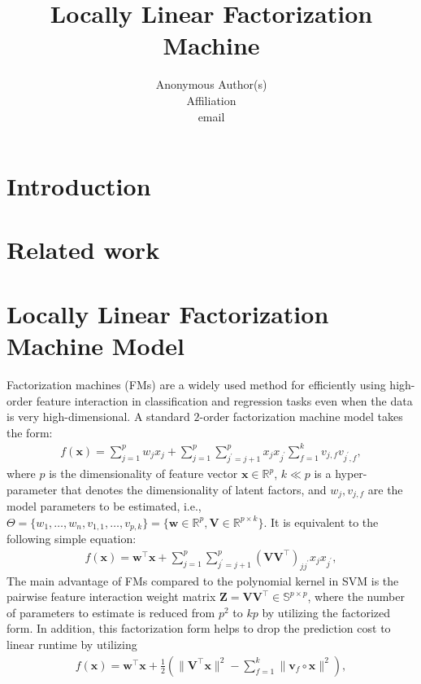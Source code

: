 \documentclass{article}
\title{Locally Linear Factorization Machine}
\author{Anonymous Author(s) \\
Affiliation \\
email}
\def \x {\mathbf{x}}
\def \w {\mathbf{w}}
\def \v {\mathbf{v}}
\def \V {\mathbf{V}}
\def \Z {\mathbf{Z}}
\begin{document}
\maketitle

\begin{abstract}

\end{abstract}

\section{Introduction}

\section{Related work}
\section{Locally Linear Factorization Machine Model}
Factorization machines (FMs) \cite{rendle2010factorization,rendle2012factorization} are a widely used method for efficiently using high-order feature interaction in classification and regression tasks even when the data is very high-dimensional. A standard $2$-order factorization machine model takes the form:
\begin{align}
f(\x) = \sum^p_{j=1}w_j x_j + \sum^p_{j=1}\sum^p_{j^\prime = j +1} x_j x_{j^\prime}\sum^k_{f=1}v_{j,f}v_{j^\prime,f},
\end{align}
where $p$ is the dimensionality of feature vector $\x \in \mathbb{R}^p$, $k \ll p$ is a hyper-parameter that denotes the dimensionality of latent factors, and $ w_j, v_{j,f}$ are the model parameters to be estimated, i.e., $\Theta=\{w_1,\dots,w_n,v_{1,1},\dots,v_{p,k}\}=\{\w \in \mathbb{R}^{p},\V \in \mathbb{R}^{p \times k}\}$. It is equivalent to the following simple equation:
\begin{align}
f(\x) = \w^\top\x+\sum^p_{j=1}\sum^p_{j^\prime=j+1}(\V\V^\top)_{jj^\prime}x_jx_{j^\prime},
\end{align}
The main advantage of FMs compared to the polynomial kernel in SVM \cite{vapnik2013nature} is the pairwise feature interaction weight matrix $\Z = \V\V^\top \in \mathbb{S}^{p \times p}$, where the number of parameters to estimate is reduced from $p^2$ to $kp$ by utilizing the factorized form. In addition, this factorization form helps to drop the prediction cost to linear runtime by utilizing
\begin{align}
f(\x) = \w^\top\x + \frac{1}{2}\left(\|\V^\top\x\|^2-\sum^k_{f=1}\|\v_f\circ\x\|^2\right),
\end{align}
\end{document}
